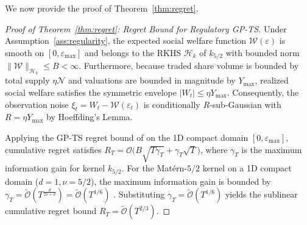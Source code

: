We now provide the proof of Theorem~\ref{thm:regret}.
\begin{proof}[Proof of Theorem~\ref{thm:regret}: Regret Bound for Regulatory GP-TS]\label{app:proof_thm_regret}\label{proof:thm_regret}
Under Assumption~\ref{ass:regularity}, the expected social welfare function $\mathcal{W}(\varepsilon)$ is smooth on $[0, \varepsilon_{\max}]$ and belongs to the RKHS $\mathcal{H}_k$ of $k_{5/2}$ with bounded norm $\|\mathcal{W}\|_{\mathcal{H}_k} \le B < \infty$. Furthermore, because traded share volume is bounded by total supply $\eta \mathcal{N}$ and valuations are bounded in magnitude by $Y_{\max}$, realized social welfare satisfies the symmetric envelope $|W_t| \le \eta Y_{\max}$. Consequently, the observation noise $\xi_t = W_t - \mathcal{W}(\varepsilon_t)$ is conditionally $R$-sub-Gaussian with $R = \eta Y_{\max}$ by Hoeffding's Lemma.

Applying the GP-TS regret bound of \citet[Theorem 4]{chowdhury2017kernelized} on the 1D compact domain $[0, \varepsilon_{\max}]$, cumulative regret satisfies $R_T = \mathcal{O}\bigl(B\sqrt{T\gamma_T} + \gamma_T\sqrt{T}\bigr)$, where $\gamma_T$ is the maximum information gain for kernel $k_{5/2}$. For the Mat\'ern-$5/2$ kernel on a 1D compact domain ($d=1, \nu=5/2$), the maximum information gain is bounded by $\gamma_T = \widetilde{\mathcal{O}}(T^{\frac{d}{2\nu+d}}) = \widetilde{\mathcal{O}}(T^{1/6})$ \citep{vakili2021information}. Substituting $\gamma_T = \widetilde{\mathcal{O}}(T^{1/6})$ yields the sublinear cumulative regret bound $R_T = \widetilde{\mathcal{O}}(T^{2/3})$.
\end{proof}

